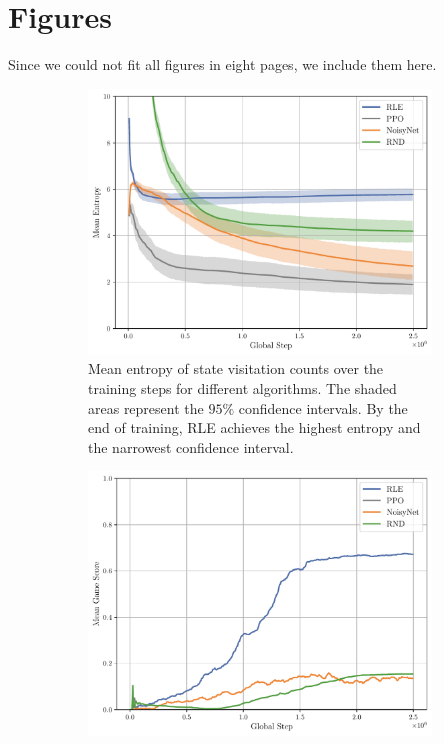 \appendix

\section{Figures}
Since we could not fit all figures in eight pages, we include them here.

\begin{figure}[h!]
  \centering
  \begin{subfigure}[b]{0.45\textwidth}
    \centering
    \includegraphics[width=\textwidth]{figures/gridworld_mean_entropy_state_visitation_algorithms.pdf}
    \caption{Mean entropy of state visitation counts over the training steps for different algorithms. The shaded areas represent the $95\%$ confidence intervals. By the end of training, \textsc{RLE} achieves the highest entropy and the narrowest confidence interval.}
    \label{fig:gridworld-entropy-algorithms}
  \end{subfigure}
  \hfill
  \begin{subfigure}[b]{0.45\textwidth}
    \centering
    \includegraphics[width=\textwidth]{figures/gridworld_mean_game_score_algorithms.pdf}

\end{subfigure}
\end{figure}
